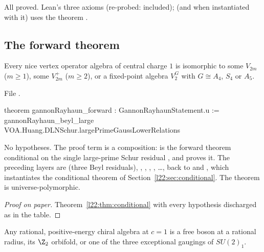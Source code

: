 \begin{status}
All proved. Lean's three axioms (re-probed:  included);  (and
 when instantiated with it) uses the theorem .
\end{status}

\subsection{The forward theorem}

\begin{theorem}\label{l22:thm:forward}
Every nice vertex operator algebra of central charge $1$ is isomorphic to some $V_{2m}$ ($m\ge1$), some
$V_{2m}^+$ ($m\ge2$), or a fixed-point algebra $V_2^G$ with $G\cong A_4$, $S_4$ or $A_5$.
\end{theorem}
\noindent File .
\begin{leancode}
theorem gannonRayhaun_forward : GannonRayhaunStatement.{u} :=
  gannonRayhaun_beyl_large VOA.Huang.DLNSchur.largePrimeGaussLowerRelations
\end{leancode}

\begin{dictionary}
No hypotheses. The proof term is a composition:  is the forward theorem conditional
on the single large-prime Schur residual , and
 proves it. The preceding layers are
 (three Beyl residuals), , ,
, , \ldots, back to  and
, which instantiates the conditional theorem of Section~\ref{l22:sec:conditional}.
The theorem is universe-polymorphic.
\end{dictionary}

\begin{proof}[Proof on paper]
Theorem~\ref{l22:thm:conditional} with every hypothesis discharged as in the table.
\end{proof}

\begin{physics}
Any rational, positive-energy chiral algebra at $c=1$ is a free boson at a rational radius, its $\Z_2$ orbifold,
or one of the three exceptional gaugings of $SU(2)_1$.
\end{physics}

